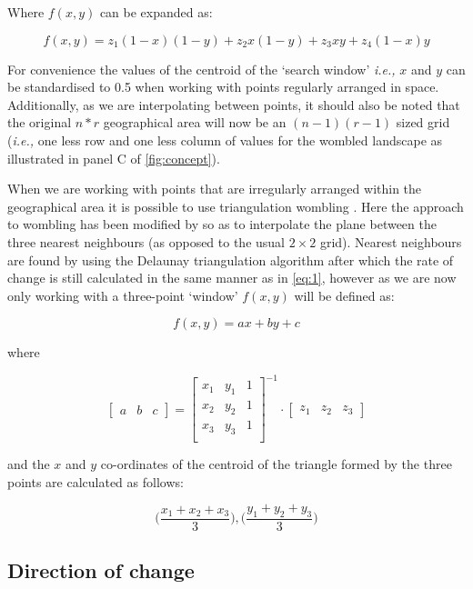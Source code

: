 Where \(f(x,y)\) can be expanded as:

$$f(x,y) = z_{1}(1-x)(1-y) + z_{2}x(1-y) + z_{3}x y + z_{4}(1-x)y$$

For convenience the values of the centroid of the `search window'
\emph{i.e.,} \(x\) and \(y\) can be standardised to 0.5 when working with
points regularly arranged in space. Additionally, as we are
interpolating between points, it should also be noted that the original
\(n*r\) geographical area will now be an \((n -1)(r - 1)\) sized grid
(\emph{i.e.,} one less row and one less column of values for the wombled
landscape as illustrated in panel C of \autoref{fig:concept}).

When we are working with points that are irregularly arranged within the
geographical area it is possible to use triangulation wombling
\cite{Fortin2005SpaAna, Fortin2021NetEco, Fortin1994EdgDet}. Here the
approach to wombling has been modified by \cite{Fortin1992DetEco} so as to
interpolate the plane between the three nearest neighbours (as opposed
to the usual \(2 \times 2\) grid). Nearest neighbours are found by using
the Delaunay triangulation algorithm \cite{Delaunay1934SphVid} after
which the rate of change is still calculated in the same manner as in
\autoref{eq:1}, however as we are now only working with a three-point
`window' \(f(x,y)\) will be defined as:

$$f(x,y) = ax + by + c$$

where

$$\left[ \begin{array}{ccc} a & b & c \end{array} \right] = 
\left[ {\begin{array}{ccc}
   x_{1} & y_{1} & 1\\
   x_{2} & y_{2} & 1\\
   x_{3} & y_{3} & 1\\
  \end{array} } \right]^{-1}\cdot
  \left[
  \begin{array}{ccc} z_{1} & z_{2} & z_{3} \end{array} \right]$$

and the \(x\) and \(y\) co-ordinates of the centroid of the triangle
formed by the three points are calculated as follows:

$$ \Big( \frac{x_{1} + x_{2} + x_{3}}{3} \Big), \Big( \frac{y_{1} + y_{2} + y_{3}}{3} \Big) $$

\subsection{Direction of change}\label{direction-of-change}

